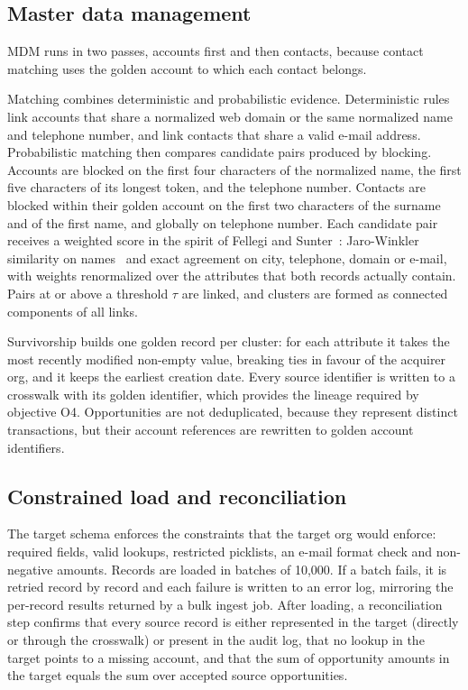 \subsection{Master data management}\label{sec:3.5}

MDM runs in two passes, accounts first and then contacts, because contact matching uses the golden account to which each contact belongs.

Matching combines deterministic and probabilistic evidence. Deterministic rules link accounts that share a normalized web domain or the same normalized name and telephone number, and link contacts that share a valid e-mail address. Probabilistic matching then compares candidate pairs produced by blocking. Accounts are blocked on the first four characters of the normalized name, the first five characters of its longest token, and the telephone number. Contacts are blocked within their golden account on the first two characters of the surname and of the first name, and globally on telephone number. Each candidate pair receives a weighted score in the spirit of Fellegi and Sunter~\cite{fellegi1969}: Jaro-Winkler similarity on names~\cite{winkler1990} and exact agreement on city, telephone, domain or e-mail, with weights renormalized over the attributes that both records actually contain. Pairs at or above a threshold $\tau$ are linked, and clusters are formed as connected components of all links.

Survivorship builds one golden record per cluster: for each attribute it takes the most recently modified non-empty value, breaking ties in favour of the acquirer org, and it keeps the earliest creation date. Every source identifier is written to a crosswalk with its golden identifier, which provides the lineage required by objective O4. Opportunities are not deduplicated, because they represent distinct transactions, but their account references are rewritten to golden account identifiers.

\subsection{Constrained load and reconciliation}\label{sec:3.6}

The target schema enforces the constraints that the target org would enforce: required fields, valid lookups, restricted picklists, an e-mail format check and non-negative amounts. Records are loaded in batches of 10,000. If a batch fails, it is retried record by record and each failure is written to an error log, mirroring the per-record results returned by a bulk ingest job. After loading, a reconciliation step confirms that every source record is either represented in the target (directly or through the crosswalk) or present in the audit log, that no lookup in the target points to a missing account, and that the sum of opportunity amounts in the target equals the sum over accepted source opportunities.

